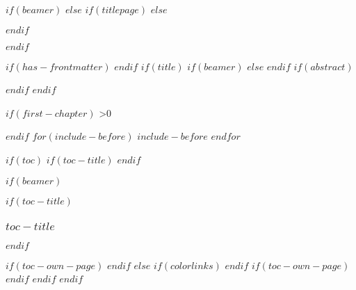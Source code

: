 \documentclass[
  $if(fontsize)$
    $fontsize$,
  $endif$
  $if(papersize)$
    $papersize$paper,
  $else$
    paper=a4,
  $endif$
  $if(beamer)$
    ignorenonframetext,
    $if(handout)$
      handout,
    $endif$
    $if(aspectratio)$
      aspectratio=$aspectratio$,
    $endif$
  $endif$
  $for(classoption)$
    $classoption$$sep$,
  $endfor$
  captions=tableheading
]{$if(beamer)$$documentclass$$else$$if(book)$scrbook$else$scrartcl$endif$$endif$}
\begin{document}
$if(beamer)$
$else$
  $if(titlepage)$
  $else$
    \maketitle %
  $endif$

$endif$ 

$if(has-frontmatter)$
\frontmatter 
$endif$
$if(title)$
  $if(beamer)$
    \frame{\titlepage}
  $else$
  $endif$
  $if(abstract)$
    \begin{abstract}
    $abstract$
    \end{abstract}
  $endif$
$endif$

$if(first-chapter)$
  \ifnum{}>0 %
    \setcounter{chapter}{$first-chapter$}
    \addtocounter{chapter}{-1}  
  \else
  \fi
$endif$
$for(include-before)$
$include-before$
$endfor$

$if(toc)$
  $if(toc-title)$
    \renewcommand*\contentsname{$toc-title$}
  $endif$
  
  $if(beamer)$
    \begin{frame}[allowframebreaks]
      $if(toc-title)$
        \frametitle{$toc-title$}
      $endif$
      \tableofcontents[hideallsubsections]
    \end{frame}
    $if(toc-own-page)$
      \newpage
    $endif$
  $else$
    \begingroup %
      $if(colorlinks)$
        \hypersetup{linkcolor=$if(toccolor)$$toccolor$$else$default-linkcolor$endif$}
      $endif$
      \setcounter{tocdepth}{$if(toc-depth)$$toc-depth$$else$2$endif$}
      \tableofcontents 
    \endgroup
    $if(toc-own-page)$
      \newpage
    $endif$
  $endif$
$endif$
\end{document}
